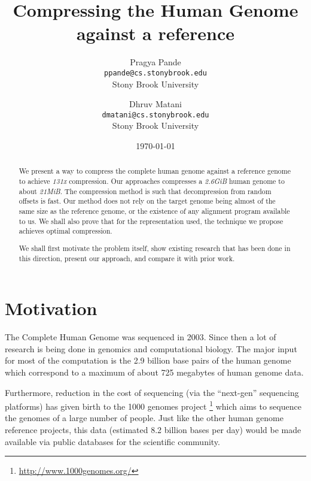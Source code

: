 \documentclass[11pt]{article}
\begin{document}
\title{Compressing the Human Genome against a reference}
\author{Pragya Pande\\\texttt{\small{ppande@cs.stonybrook.edu}}\\\small{Stony Brook University} \and 
  Dhruv Matani\\\texttt{\small{dmatani@cs.stonybrook.edu}}\\\small{Stony Brook University}
}
\date{\today}

\maketitle

\vspace{0.5in}

\begin{abstract}
  We present a way to compress the complete human genome against a
  reference genome to achieve \textit{131x} compression. Our
  approaches compresses a \textit{2.6GiB} human genome to about
  \textit{21MiB}. The compression method is such that decompression
  from random offsets is fast. Our method does not rely on the target
  genome being almost of the same size as the reference genome, or the
  existence of any alignment program available to us. We shall also
  prove that for the representation used, the technique we propose
  achieves optimal compression.

  We shall first motivate the problem itself, show existing research
  that has been done in this direction, present our approach, and
  compare it with prior work.

\end{abstract}

\section{Motivation}

The Complete Human Genome was sequenced in 2003. Since then a lot of
research is being done in genomics and computational biology. The
major input for most of the computation is the 2.9 billion base pairs
\cite{howmuchsequenced}\cite{findinghumangenome} of the human genome
which correspond to a maximum of about 725 megabytes of human
genome data.\cite{wikipediahumangenome}

Furthermore, reduction in the cost of sequencing (via the ``next-gen''
sequencing platforms) has given birth to the 1000 genomes project
\footnote{\url{http://www.1000genomes.org/}} which aims to sequence
the genomes of a large number of people. Just like the other human
genome reference projects, this data (estimated 8.2 billion bases per
day) would be made available via public databases for the scientific
community.\cite{1000genomes}
\end{document}

